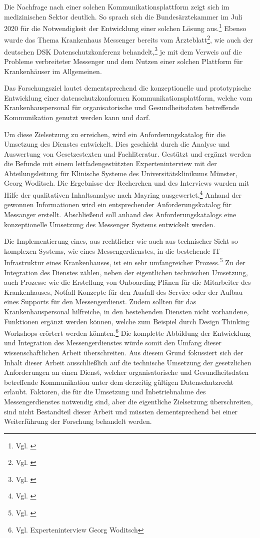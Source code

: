 Die Nachfrage nach einer solchen Kommunikationsplattform zeigt sich im medizinischen Sektor deutlich. So sprach sich die Bundesärztekammer im Juli 2020 für die Notwendigkeit der Entwicklung einer solchen Lösung aus.\footnote{Vgl. \cite[S. 2]{Bundesaerztekammer2020}} Ebenso wurde das Thema Krankenhaus Messenger bereits vom Ärzteblatt\footnote{Vgl. \cite{Giesselmann2018}}, wie auch der deutschen DSK Datenschutzkonferenz behandelt,\footnote{Vgl. \cite[S. 1 ff.]{Datenschutzkonferenz2019}} je mit dem Verweis auf die Probleme verbreiteter Messenger und dem Nutzen einer solchen Plattform für Krankenhäuser im Allgemeinen.

Das Forschungsziel lautet dementsprechend die konzeptionelle und prototypische Entwicklung einer datenschutzkonformen Kommunikationsplattform, welche vom Krankenhauspersonal für organisatorische und Gesundheitsdaten betreffende Kommunikation genutzt werden kann und darf. 

Um diese Zielsetzung zu erreichen, wird ein Anforderungskatalog für die Umsetzung des Dienstes entwickelt. Dies geschieht durch die Analyse und Auswertung von Gesetzestexten und Fachliteratur. Gestützt und ergänzt werden die Befunde mit einem leitfadengestützten Experteninterview mit der Abteilungsleitung für Klinische Systeme des Universitätsklinikums Münster, Georg Woditsch. Die Ergebnisse der Recherchen und des Interviews wurden mit Hilfe der qualitativen Inhaltsanalyse nach Mayring ausgewertet.\footnote{Vgl. \cite[S. 543 ff.]{Baur2014}} Anhand der gewonnen Informationen wird ein entsprechender Anforderungskatalog für Messanger erstellt. Abschließend soll anhand des Anforderungskatalogs eine konzeptionelle Umsetzung des Messenger Systems entwickelt werden.

Die Implementierung eines, aus rechtlicher wie auch aus technischer Sicht so komplexen Systems, wie eines Messengerdienstes, in die bestehende IT-Infrastruktur eines Krankenhauses, ist ein sehr umfangreicher Prozess.\footnote{Vgl. \cite[S. 4 ff.]{Muhammad2017}} Zu der Integration des Dienstes zählen, neben der eigentlichen technischen Umsetzung, auch Prozesse wie die Erstellung von Onboarding Plänen für die Mitarbeiter des Krankenhauses, Notfall Konzepte für den Ausfall des Service oder der Aufbau eines Supports für den Messengerdienst. Zudem sollten für das Krankenhauspersonal hilfreiche, in den bestehenden Diensten nicht vorhandene, Funktionen ergänzt werden können, welche zum Beispiel durch Design Thinking Workshops erörtert werden könnten.\footnote{Vgl. Experteninterview Georg Woditsch} Die komplette Abbildung der Entwicklung und Integration des Messengerdienstes würde somit den Umfang dieser wissenschaftlichen Arbeit überschreiten. Aus diesem Grund fokussiert sich der Inhalt dieser Arbeit ausschließlich auf die technische Umsetzung der gesetzlichen Anforderungen an einen Dienst, welcher organisatorische und Gesundheitsdaten betreffende Kommunikation unter dem derzeitig gültigen Datenschutzrecht erlaubt. Faktoren, die für die Umsetzung und Inbetriebnahme des Messengerdienstes notwendig sind, aber die eigentliche Zielsetzung überschreiten, sind nicht Bestandteil dieser Arbeit und müssten dementsprechend bei einer Weiterführung der Forschung behandelt werden.
